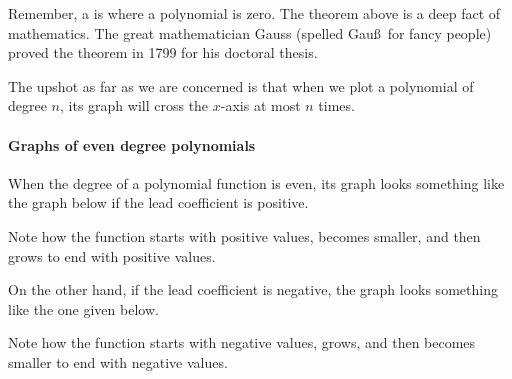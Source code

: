 \documentclass{ximera}
\begin{document}
Remember, a  is where a polynomial is zero. The theorem
above is a deep fact of mathematics. The great mathematician Gauss
(spelled Gau\ss\ for fancy people) proved the theorem in 1799 for his
doctoral thesis. 

The upshot as far as we are concerned is that when we plot a
polynomial of degree $n$, its graph will cross the $x$-axis at most
$n$ times.

\paragraph{Graphs of even degree polynomials}


When the degree of a polynomial function is even, its graph looks
something like the graph below if the lead coefficient is positive.

\begin{image}
\end{image}
Note how the function starts with positive values, becomes smaller,
and then grows to end with positive values.

On the other hand, if the lead coefficient is negative, the graph
looks something like the one given below.

\begin{image}
\end{image}
Note how the function starts with negative values, grows, and then
becomes smaller to end with negative values.
\end{document}
